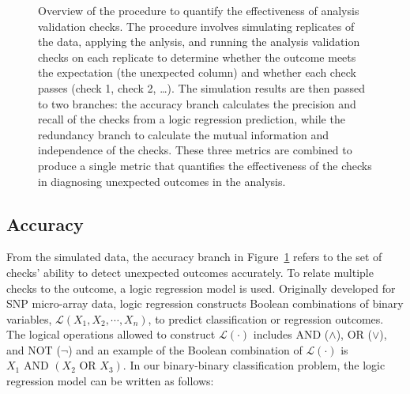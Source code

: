 \documentclass[
  12pt,
]{interact}
\begin{document}
\label{cell-fig-metric-calc}
\begin{figure}[H]


\caption{\label{fig-metric-calc}Overview of the procedure to quantify
the effectiveness of analysis validation checks. The procedure involves
simulating replicates of the data, applying the anlysis, and running the
analysis validation checks on each replicate to determine whether the
outcome meets the expectation (the unexpected column) and whether each
check passes (check 1, check 2, \ldots). The simulation results are then
passed to two branches: the accuracy branch calculates the precision and
recall of the checks from a logic regression prediction, while the
redundancy branch to calculate the mutual information and independence
of the checks. These three metrics are combined to produce a single
metric that quantifies the effectiveness of the checks in diagnosing
unexpected outcomes in the analysis.}

\end{figure}%

\subsection{Accuracy}\label{accuracy}

From the simulated data, the accuracy branch in
Figure~\ref{fig-metric-calc} refers to the set of checks' ability to
detect unexpected outcomes accurately. To relate multiple checks to the
outcome, a logic regression model \citep{ruczinski_logic_2003} is used.
Originally developed for SNP micro-array data, logic regression
constructs Boolean combinations of binary variables,
\(\mathcal{L}(X_1, X_2, \cdots, X_n)\), to predict classification or
regression outcomes. The logical operations allowed to construct
\(\mathcal{L(\cdot)}\) includes AND (\(\land\)), OR (\(\lor\)), and NOT
(\(\neg\)) and an example of the Boolean combination of
\(\mathcal{L(\cdot)}\) is \(X_1 \text{ AND } (X_2 \text{ OR } X_3)\). In
our binary-binary classification problem, the logic regression model can
be written as follows:
\end{document}
